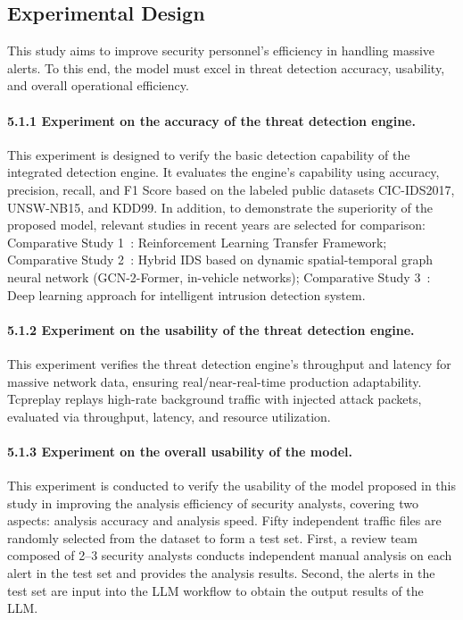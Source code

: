 \documentclass[sigconf,authordraft]{acmart}
\begin{document}
\subsection{Experimental Design}

This study aims to improve security personnel's efficiency in handling massive alerts. To this end, the model must excel in threat detection accuracy, usability, and overall operational efficiency.

\paragraph{5.1.1 Experiment on the accuracy of the threat detection engine.}
This experiment is designed to verify the basic detection capability of the integrated detection engine. It evaluates the engine's capability using accuracy, precision, recall, and F1 Score based on the labeled public datasets CIC-IDS2017, UNSW-NB15, and KDD99. In addition, to demonstrate the superiority of the proposed model, relevant studies in recent years are selected for comparison: Comparative Study 1~\cite{ref26}: Reinforcement Learning Transfer Framework; Comparative Study 2~\cite{ref27}: Hybrid IDS based on dynamic spatial-temporal graph neural network (GCN-2-Former, in-vehicle networks); Comparative Study 3~\cite{ref28}: Deep learning approach for intelligent intrusion detection system.

\paragraph{5.1.2 Experiment on the usability of the threat detection engine.}
This experiment verifies the threat detection engine's throughput and latency for massive network data, ensuring real/near-real-time production adaptability. Tcpreplay replays high-rate background traffic with injected attack packets, evaluated via throughput, latency, and resource utilization.

\paragraph{5.1.3 Experiment on the overall usability of the model.}
This experiment is conducted to verify the usability of the model proposed in this study in improving the analysis efficiency of security analysts, covering two aspects: analysis accuracy and analysis speed. Fifty independent traffic files are randomly selected from the dataset to form a test set. First, a review team composed of 2--3 security analysts conducts independent manual analysis on each alert in the test set and provides the analysis results. Second, the alerts in the test set are input into the LLM workflow to obtain the output results of the LLM.
\end{document}
